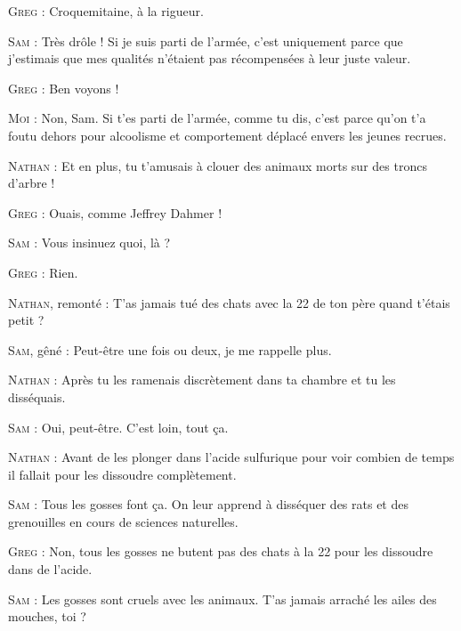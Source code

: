 \begin{dialogue}
\textsc{Greg} : Croquemitaine, à la rigueur.

\textsc{Sam} : Très drôle ! Si je suis parti de l’armée, c’est uniquement parce que j’estimais que mes qualités n’étaient pas récompensées à leur juste valeur.

\textsc{Greg} : Ben voyons !

\textsc{Moi} : Non, Sam. Si t’es parti de l’armée, comme tu dis, c’est parce qu’on t’a foutu dehors pour alcoolisme et comportement déplacé envers les jeunes recrues.

\textsc{Nathan} : Et en plus, tu t’amusais à clouer des animaux morts sur des troncs d’arbre !

%
%
%
\textsc{Greg} : Ouais, comme Jeffrey Dahmer !

\textsc{Sam} : Vous insinuez quoi, là ?

\textsc{Greg} : Rien.

\textsc{Nathan}, remonté : T’as jamais tué des chats avec la 22 de ton père quand t’étais petit ?

\textsc{Sam}, gêné : Peut-être une fois ou deux, je me rappelle plus.

\textsc{Nathan} : Après tu les ramenais discrètement dans ta chambre et tu les disséquais.

\textsc{Sam} : Oui, peut-être. C’est loin, tout ça.

\textsc{Nathan} : Avant de les plonger dans l’acide sulfurique pour voir combien de temps il fallait pour les dissoudre complètement.

\textsc{Sam} : Tous les gosses font ça. On leur apprend à disséquer des rats et des grenouilles en cours de sciences naturelles.

\textsc{Greg} : Non, tous les gosses ne butent pas des chats à la 22 pour les dissoudre dans de l’acide.

\textsc{Sam} : Les gosses sont cruels avec les animaux. T’as jamais arraché les ailes des mouches, toi ?


\end{dialogue}
